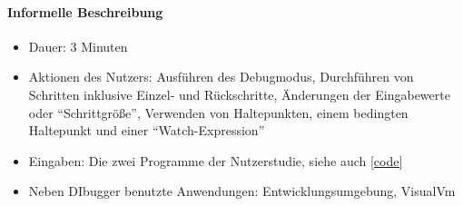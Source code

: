 \documentclass[parskip=full]{scrartcl}
\begin{document}
        \paragraph{Informelle Beschreibung}
        \begin{itemize}
            \item{Dauer:} 3 Minuten 
            \item{Aktionen des Nutzers:} Ausführen des Debugmodus, Durchführen von Schritten inklusive Einzel- und Rückschritte, Änderungen der Eingabewerte oder \enquote{Schrittgröße}, Verwenden von Haltepunkten, einem bedingten Haltepunkt und einer \enquote{Watch-Expression}
            \item{Eingaben:} Die zwei Programme der Nutzerstudie, siehe auch \ref{code}
            \item{Neben DIbugger benutzte Anwendungen:} Entwicklungsumgebung, VisualVm
        \end{itemize}
\end{document}
